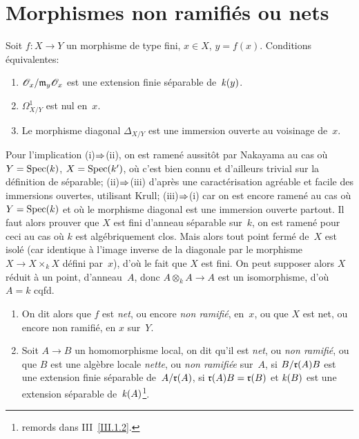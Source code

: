 \section{Morphismes non ramifi\'es ou nets}
\label{I.3}
\begin{proposition}
\label{I.3.1}
Soit $f\colon X\to Y$ un morphisme de type fini, $x\in X$,
$y=f(x)$. Conditions \'equivalentes:
\begin{enumerate}
\item[(i)] $\cal{O}_x/\goth{m}_y\cal{O}_x$ est une extension finie
s\'eparable de~$\mathit{k}(y)$.
\item[(ii)] $\mathit{\Omega}^1_{X/Y}$ est nul en~$x$.
\item[(iii)] Le morphisme diagonal $\Delta_{X/Y}$ est une immersion
ouverte au voisinage de~$x$.
\end{enumerate}
\end{proposition}
Pour l'implication (i)$\To$(ii), on est ramen\'e
aussit\^ot par Nakayama au cas o\`u $Y=\operatorname{Spec}(k)$,
$X=\operatorname{Spec}(k')$, o\`u c'est bien connu et d'ailleurs trivial
sur la d\'efinition de s\'eparable; (ii)$\To$(iii)
d'apr\`es une caract\'erisation agr\'eable et facile des
immersions ouvertes, utilisant Krull; (iii)$\To$(i) car on est
encore ramen\'e au cas o\`u $Y=\operatorname{Spec}(k)$ et o\`u le
morphisme diagonal est une immersion ouverte partout. Il faut alors
prouver que $X$ est fini d'anneau s\'eparable sur~$k$, on est
ramen\'e pour ceci au cas o\`u $k$ est alg\'ebriquement
clos. Mais alors tout point ferm\'e de~$X$ est isol\'e (car
identique \`a l'image inverse de la diagonale par le morphisme $X\to
X\times_k X$ d\'efini par~$x$), d'o\`u le fait que $X$ est
fini. On peut supposer alors $X$ r\'eduit \`a un point,
d'anneau~$A$, donc $A\otimes_k A\to A$ est un isomorphisme, d'o\`u
$A=k$ cqfd.

\begin{definition}
\label{I.3.2}
\begin{enumerate}
\item[a)] On dit alors que $f$ est \emph{net},
ou encore \emph{non ramifié},
en~$x$, ou que $X$ est net, ou encore non ramifi\'e, en $x$ sur~$Y$.
\item[b)] Soit $A\to B$ un homomorphisme local, on dit qu'il est
\emph{net}, ou \emph{non ramifié}, ou que $B$ est une alg\`ebre
locale \emph{nette}, ou \emph{non ramifiée} sur~$A$, si 
$B/\mathfrak{r}(A)B$ est une extension finie s\'eparable de~$A/\mathfrak{r}(A)$, \ie si $\mathfrak{r}(A)B=\mathfrak{r}(B)$
et $\mathit{k}(B)$ est une extension s\'eparable
de~$\mathit{k}(A)$\footnote{\Cf remords dans III~\ref{III.1.2}.}.
\end{enumerate}
\end{definition}


